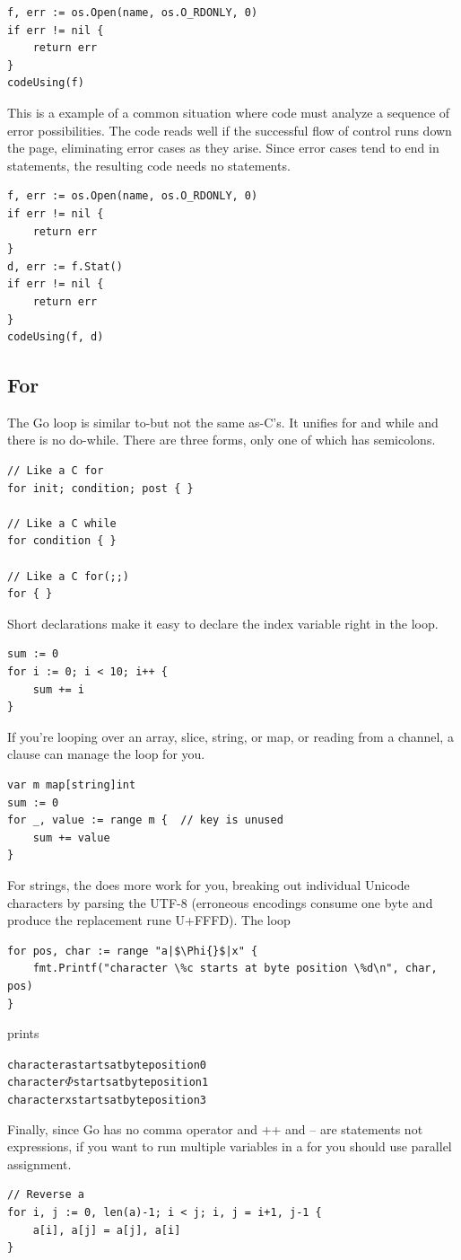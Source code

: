\begin{lstlisting}
f, err := os.Open(name, os.O_RDONLY, 0)
if err != nil {
    return err
}
codeUsing(f)
\end{lstlisting}
This is a example of a common situation where code must analyze a
sequence of error possibilities. The code reads well if the successful
flow of control runs down the page, eliminating error cases as they
arise. Since error cases tend to end in  statements, the resulting
code needs no  statements.
\begin{lstlisting}
f, err := os.Open(name, os.O_RDONLY, 0)
if err != nil {
    return err
}
d, err := f.Stat()
if err != nil {
    return err
}
codeUsing(f, d)
\end{lstlisting}

\subsection{For}
The Go  loop is similar to-but not the same as-C's. It unifies for
and while and there is no do-while. There are three forms, only one of
which has semicolons.
\begin{lstlisting}
// Like a C for
for init; condition; post { }

// Like a C while
for condition { }

// Like a C for(;;)
for { }
\end{lstlisting}
Short declarations make it easy to declare the index variable right in the loop.
\begin{lstlisting}
sum := 0
for i := 0; i < 10; i++ {
    sum += i
}
\end{lstlisting}
If you're looping over an array, slice, string, or map, or reading from
a channel, a  clause can manage the loop for you.
\begin{lstlisting}
var m map[string]int
sum := 0
for _, value := range m {  // key is unused
    sum += value
}
\end{lstlisting}
For strings, the  does more work for you, breaking out individual
Unicode characters by parsing the UTF-8 (erroneous encodings consume one
byte and produce the replacement rune U+FFFD). The loop

\begin{lstlisting}
for pos, char := range "a|$\Phi{}$|x" {
    fmt.Printf("character \%c starts at byte position \%d\n", char, pos)
}
\end{lstlisting}
prints
\begin{alltt}
character a starts at byte position 0
character \begin{math}\Phi\end{math} starts at byte position 1
character x starts at byte position 3
\end{alltt}
Finally, since Go has no comma operator and ++ and -- are statements not
expressions, if you want to run multiple variables in a for you should
use parallel assignment.
\begin{lstlisting}
// Reverse a
for i, j := 0, len(a)-1; i < j; i, j = i+1, j-1 {
    a[i], a[j] = a[j], a[i]
}
\end{lstlisting}

